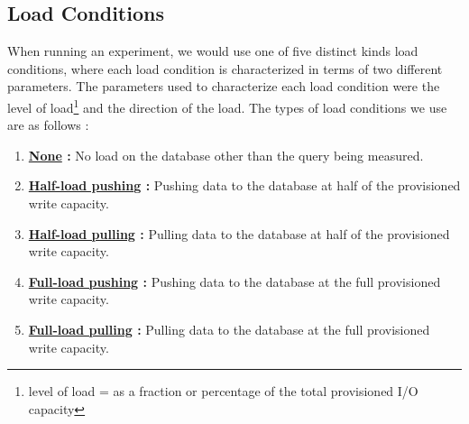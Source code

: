 \subsection{Load Conditions}

When running an experiment, we would use one of five distinct kinds load conditions, where each load condition is characterized in terms of two different parameters.  The parameters used to characterize each load condition were the level of load\footnote{level of load = as a fraction or percentage of the total provisioned I/O capacity} and the direction of the load.  The types of load conditions we use are as follows :

\vspace{0.1in}
\begin{spacing}{1.2}
\begin{enumerate}[label=\large{\textbf{\Alph*}):}]
	\item \textbf{\underline{None} :} No load on the database other than the query being measured.
	\vspace{0.05in}
	\item \textbf{\underline{Half-load pushing} :} Pushing data to the database at half of the provisioned write capacity.
	\vspace{0.05in}
	\item \textbf{\underline{Half-load pulling} :} Pulling data to the database at half of the provisioned write capacity.
	\vspace{0.05in}
	\item \textbf{\underline{Full-load pushing} :} Pushing data to the database at the full provisioned write capacity.
	\vspace{0.05in}
	\item \textbf{\underline{Full-load pulling} :} Pulling data to the database at the full provisioned write capacity.
\end{enumerate}
\end{spacing}






